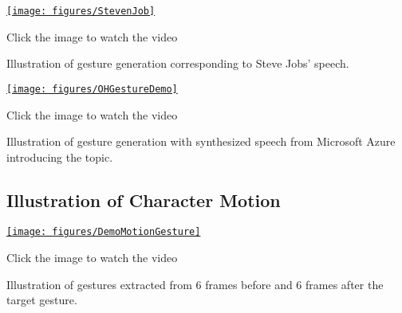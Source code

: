 {
	\begin{center}
		\centering
		\href{https://www.youtube.com/watch?v=B6nv1kQmi-Q}{%
			\texttt{[image: figures/StevenJob]}}
		
		{\tiny Click the image to watch the video}
	\end{center}
}

Illustration of gesture generation corresponding to Steve Jobs’ speech.

{
	\begin{center}
		\centering
		\href{https://youtu.be/yLwXdm7UgPE}{%
			\texttt{[image: figures/OHGestureDemo]}}
		
		{\tiny Click the image to watch the video}
	\end{center}
}

Illustration of gesture generation with synthesized speech from Microsoft Azure introducing the topic.

\subsection{Illustration of Character Motion}

\begin{center}
	{
		\centering
		\href{https://www.youtube.com/watch?v=9IIIZP3EJLg}{%
			\texttt{[image: figures/DemoMotionGesture]}}
		
		{\tiny Click the image to watch the video}
	}
\end{center}
Illustration of gestures extracted from 6 frames before and 6 frames after the target gesture.
